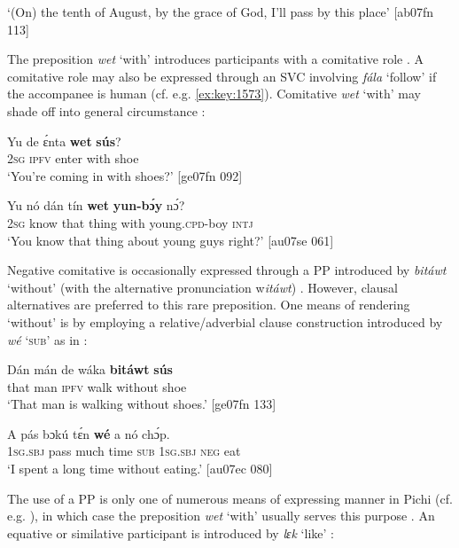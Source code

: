 \glt ‘(On) the tenth of August, by the grace of God, I’ll pass by this place’ [ab07fn 113]
\z

The preposition \textit{wet} ‘with’ introduces participants with a comitative role . A comitative role may also be expressed through an SVC involving \textit{fála} ‘follow’ if the accompanee is human (cf. e.g. \ref{ex:key:1573}). Comitative \textit{wet} ‘with’ may shade off into general circumstance : 


\ea%
    \label{ex:key:1071}
    \gll Yu  de  ɛ́nta    \textbf{wet}    \textbf{sús}?\\
\textsc{2sg}  \textsc{ipfv}  enter  with    shoe\\

\glt ‘You’re coming in with shoes?’ [ge07fn 092]
\z


\ea%
    \label{ex:key:1072}
    \gll Yu  nó    dán  tín    \textbf{wet}    \textbf{yun-bɔ́y}      nɔ́?\\
\textsc{2sg}  know  that  thing  with    young\textsc{.cpd}{}-boy  \textsc{intj}\\

\glt ‘You know that thing about young guys right?’ [au07se 061]
\z

Negative comitative is occasionally expressed through a PP introduced by \textit{bitáwt} ‘without’ (with the alternative pronunciation w\textit{itáwt}) . However, clausal alternatives are preferred to this rare preposition. One means of rendering ‘without’ is by employing a relative/adverbial clause construction introduced by \textit{wé} ‘\textsc{sub}’ as in : 


\ea%
    \label{ex:key:1073}
    \gll Dán  mán    de  wáka  \textbf{bitáwt}  \textbf{sús}\\
that  man    \textsc{ipfv}  walk  without  shoe\\

\glt ‘That man is walking without shoes.’ [ge07fn 133]
\z


\ea%
    \label{ex:key:1074}
    \gll A    pás    bɔkú  tɛ́n    \textbf{wé}  a    nó  chɔ́p.\\
\textsc{1sg.sbj}  pass    much  time    \textsc{sub}  \textsc{1sg.sbj}  \textsc{neg}  eat\\

\glt ‘I spent a long time without eating.’ [au07ec 080]
\z

The use of a PP is only one of numerous means of expressing manner in Pichi \is{}(cf. e.g. ), in which case the preposition \textit{wet} ‘with’ usually serves this purpose . An equative or similative participant is introduced by \textit{lɛk} ‘like’ :



